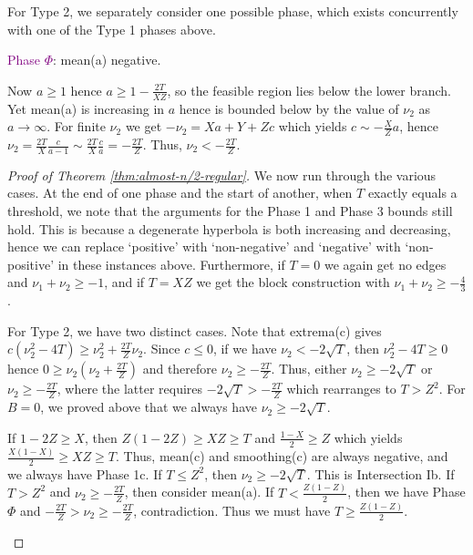 \documentclass[11pt]{article}
\newcommand{\purp}[1]{\textcolor{purple}{#1}}
\begin{document}
For Type 2, we separately consider one possible phase, which exists concurrently with one of the Type 1 phases above. 

\begin{outline}[enumerate]
    \1 \purp{Phase $\Phi$}: mean(a) negative. 

    Now $a \ge 1$ hence $a \ge 1-\frac{2T}{XZ}$, so the feasible region lies below the lower branch. Yet mean(a) is increasing in $a$ hence is bounded below by the value of $\nu_2$ as $a \to \infty$. For finite $\nu_2$ we get $-\nu_2 = Xa + Y + Zc$ which yields $c \sim -\frac{X}Z a$, hence $\nu_2 = \frac{2T}{X} \frac{c}{a-1} \sim \frac{2T}{X} \frac{c}{a} = -\frac{2T}{Z}$. Thus, $\nu_2 < -\frac{2T}{Z}$. \\
\end{outline}

\begin{proof}[Proof of Theorem \ref{thm:almost-n/2-regular}]
    We now run through the various cases. At the end of one phase and the start of another, when $T$ exactly equals a threshold, we note that the arguments for the Phase 1 and Phase 3 bounds still hold. This is because a degenerate hyperbola is both increasing and decreasing, hence we can replace `positive' with `non-negative' and `negative' with `non-positive' in these instances above. Furthermore, if $T = 0$ we again get no edges and $\nu_1 + \nu_2 \ge -1$, and if $T = XZ$ we get the block construction with $\nu_1 + \nu_2 \ge -\frac43$. 

    For Type 2, we have two distinct cases. Note that extrema(c) gives $c(\nu_2^2 - 4T) \ge \nu_2^2 + \frac{2T}{Z}\nu_2$. Since $c \le 0$, if we have $\nu_2 < -2\sqrt{T}$, then $\nu_2^2 - 4T \ge 0$ hence $0 \ge \nu_2(\nu_2 + \frac{2T}{Z})$ and therefore $\nu_2 \ge -\frac{2T}{Z}$. Thus, either $\nu_2 \ge -2\sqrt{T}$ or $\nu_2 \ge -\frac{2T}{Z}$, where the latter requires $-2\sqrt{T} > -\frac{2T}{Z}$ which rearranges to $T > Z^2$. For $B = 0$, we proved above that we always have $\nu_2 \ge -2\sqrt{T}$. 
    \begin{outline}
        \1[-] If $1-2Z \ge X$, then $Z(1-2Z) \ge XZ \ge T$ and $\frac{1-X}{2} \ge Z$ which yields $\frac{X(1-X)}{2} \ge XZ \ge T$. Thus, mean(c) and smoothing(c) are always negative, and we always have Phase 1c. 
        \2[-] If $T \le Z^2$, then $\nu_2 \ge -2\sqrt{T}$. This is Intersection Ib.
        \2[-] If $T > Z^2$ and $\nu_2 \ge -\frac{2T}{Z}$, then consider mean(a). If $T < \frac{Z(1-Z)}{2}$, then we have Phase $\Phi$ and $-\frac{2T}{Z} > \nu_2 \ge -\frac{2T}{Z}$, contradiction. Thus we must have $T \ge \frac{Z(1-Z)}{2}$. 
        

\end{outline}
\end{proof}
\end{document}
